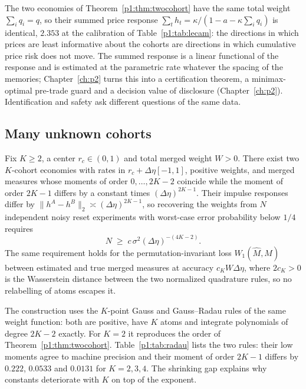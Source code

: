 \begin{remark}\label{p1:rem:riskneutral}
The two economies of Theorem~\ref{p1:thm:twocohort} have the same total weight $\sum_iq_i=q$, so their summed price response $\sum_th_t=\kappa/(1-a-\kappa\sum_iq_i)$ is identical, $2.353$ at the calibration of Table~\ref{p1:tab:lecam}: the directions in which prices are least informative about the cohorts are directions in which cumulative price risk does not move. The summed response is a linear functional of the response and is estimated at the parametric rate whatever the spacing of the memories; Chapter~\ref{ch:p2} turns this into a certification theorem, a minimax-optimal pre-trade guard and a decision value of disclosure (Chapter~\ref{ch:p2}). Identification and safety ask different questions of the same data.
\end{remark}

\subsection{Many unknown cohorts}

\begin{theorem}\label{p1:thm:kcohort}
Fix $K\ge2$, a center $r_c\in(0,1)$ and total merged weight $W>0$. There exist two $K$-cohort economies with rates in $r_c+\Delta\eta[-1,1]$, positive weights, and merged measures whose moments of order $0,\ldots,2K-2$ coincide while the moment of order $2K-1$ differs by a constant times $(\Delta\eta)^{2K-1}$. Their impulse responses differ by $\|h^A-h^B\|_2\asymp(\Delta\eta)^{2K-1}$, so recovering the weights from $N$ independent noisy reset experiments with worst-case error probability below $1/4$ requires
\[
N\;\ge\;c\,\sigma^2(\Delta\eta)^{-(4K-2)} .
\]
The same requirement holds for the permutation-invariant loss $W_1(\hat M,M)$ between estimated and true merged measures at accuracy $c_KW\Delta\eta$, where $2c_K>0$ is the Wasserstein distance between the two normalized quadrature rules, so no relabelling of atoms escapes it.
\end{theorem}

The construction uses the $K$-point Gauss and Gauss--Radau rules of the same weight function: both are positive, have $K$ atoms and integrate polynomials of degree $2K-2$ exactly. For $K=2$ it reproduces the order of Theorem~\ref{p1:thm:twocohort}. Table~\ref{p1:tab:radau} lists the two rules: their low moments agree to machine precision and their moment of order $2K-1$ differs by $0.222$, $0.0533$ and $0.0131$ for $K=2,3,4$. The shrinking gap explains why constants deteriorate with $K$ on top of the exponent.

